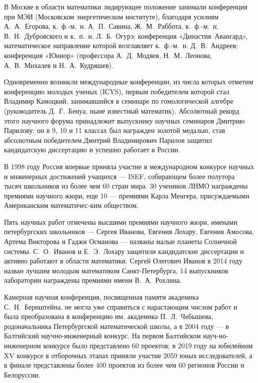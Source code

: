 \ms\abz В Москве в области математики лидирующее положение занимали конференция при МЭИ (Московском энергетическом институте), благодаря усилиям А.~А.~Егорова, к.~ф.-м.~н. А.~П.~Савина, Ж.~М.~Раббота, к.~ф.-м.~н. В.~Н.~Дубровского и к.~п.~н. Л.~Б.~Огурэ; конференция «Династия–Авангард», математическое направление которой возглавляет к.~ф.-м.~н. Д.~В.~Андреев; конференция «Юниор» (профессора А.~Д.~Модяев, Н.~М.~Леонова, А.~В.~Михалев и Н.~А.~Кудряшев).

\ms\abz Одновременно возникли международные конференции, из числа которых отметим конференцию молодых ученых (IСYS),  первым победителем которой стал Владимир Камоцкий, занимавшийся в семинаре по гомологической алгебре (руководитель Д.~Г.~Бенуа, ныне известный математик). Абсолютный рекорд этого научного форума принадлежит выпускнику научных семинаров Дмитрию Парилову: он в 9, 10 и 11 классах был награжден золотой медалью, став абсолютным победителем.\linebreak Дмитрий Владимирович Парилов защитил кандидатскую диссертацию и успешно работает в России. 

\ms\abz В 1998 году Россия впервые приняла участие в международном конкурсе научных и инженерных достижений учащихся — ISEF, собирающем более полутора тысяч школьников из более чем 60 стран мира. 30 учеников ЛНМО награждены премиями научного жюри, еще 10 — премиями Карла Менгера, присуждаемыми Американским математичес-\linebreak ким обществом.

\ms\abz Пять научных работ отмечены высшими премиями научного жюри, именами петербургских школьников — Сергея Иванова, Евгения Лохару, Евгения Амосова, Артема Викторова и Гаджи Османова — названы малые планеты Солнечной системы. С.~О.~Иванов и Е.~Э.~Лохару защитили кандидатские диссертации и активно работают в области математики. Сергей Олегович Иванов в 2014 году назван лучшим молодым математиком Санкт-Петербурга, 14 выпускников лаборатории награждены премиями имени В.~А.~Рохлина.

\ms\abz Камерная научная конференция, посвященная памяти академика С.~Н.~Бернштейна, не могла уже справиться с нарастающим числом работ и была преобразована в конференцию им. академика П.~Л.~Чебышева, родоначальника Петербургской математической школы, а в 2004 году — в Балтийский научно-инженерный конкурс. На первом Балтийском науч-\linebreak но-инженерном конкурсе было представлено 60 проектов; в 2019 году на юбилейном XV конкурсе в отборочных этапах приняли участие 2059 юных исследователей, а в финале представлены более 400 проектов из более чем 60 регионов России и Белоруссии.


